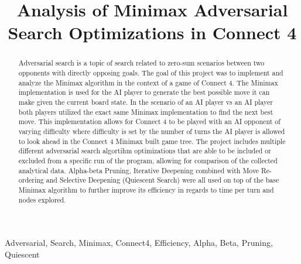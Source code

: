 \documentclass[conference]{IEEEtran}
\begin{document}
\title{Analysis of Minimax Adversarial Search Optimizations in Connect 4}

\author{
}

\maketitle

\begin{abstract}
    Adversarial search is a topic of search related to zero-sum scenarios between two opponents with directly opposing goals. The goal of this project was to implement and analyze the Minimax algorithm in the context of a game of Connect 4. The Minimax implementation is used for the AI player to generate the best possible move it can make given the current board state. In the scenario of an AI player vs an AI player both players utilized the exact same Minimax implementation to find the next best move. This implementation allows for Connect 4 to be played with an AI opponent of varying difficulty where difficulty is set by the number of turns the AI player is allowed to look ahead in the Connect 4 Minimax built game tree. The project includes multiple different adversarial search algortihm optimizations that are able to be included or excluded from a specific run of the program, allowing for comparison of the collected analytical data. Alpha-beta Pruning, Iterative Deepening combined with Move Re-ordering and Selective Deepening (Quiescent Search) were all used on top of the base Minimax algorithm to further improve its efficiency in regards to time per turn and nodes explored.

\end{abstract}

\begin{IEEEkeywords}
    Adversarial, Search, Minimax, Connect4, Efficiency, Alpha, Beta, Pruning, Quiescent

\end{IEEEkeywords}

\end{document}
